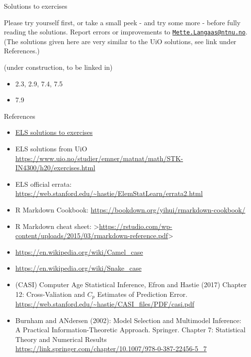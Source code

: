 \documentclass[
  ignorenonframetext,
]{beamer}
\providecommand{\tightlist}{%
  \setlength{\itemsep}{0pt}\setlength{\parskip}{0pt}}
\begin{document}
\begin{frame}{Solutions to exercises}
\protect\hypertarget{solutions-to-exercises}{}

Please try yourself first, or take a small peek - and try some more -
before fully reading the solutions. Report errors or improvements to
\href{mailto:Mette.Langaas@ntnu.no}{\nolinkurl{Mette.Langaas@ntnu.no}}.
(The solutions given here are very similar to the UiO solutions, see
link under References.)

(under construction, to be linked in)

\begin{itemize}
\tightlist
\item
  2.3, 2.9, 7.4, 7.5
\item
  7.9
\end{itemize}

\end{frame}

\begin{frame}{References}
\protect\hypertarget{references}{}

\begin{itemize}
\item
  \href{https://waxworksmath.com/Authors/G_M/Hastie/hastie.html}{ELS
  solutions to exercises}
\item
  ELS solutions from UiO
  \url{https://www.uio.no/studier/emner/matnat/math/STK-IN4300/h20/exercises.html}
\item
  ELS official errata:
  \url{https://web.stanford.edu/~hastie/ElemStatLearn/errata2.html}
\item
  R Markdown Cookbook:
  \url{https://bookdown.org/yihui/rmarkdown-cookbook/}
\item
  R Markdown cheat sheet:
  \textgreater{}\url{https://rstudio.com/wp-content/uploads/2015/03/rmarkdown-reference.pdf}\textgreater{}
\item
  \url{https://en.wikipedia.org/wiki/Camel_case}
\item
  \url{https://en.wikipedia.org/wiki/Snake_case}
\item
  (CASI) Computer Age Statistical Inference, Efron and Hastie (2017)
  Chapter 12: Cross-Valiation and \(C_p\) Estimates of Prediction Error.
  \url{https://web.stanford.edu/~hastie/CASI_files/PDF/casi.pdf}
\item
  Burnham and ANdersen (2002): Model Selection and Multimodel Inference:
  A Practical Information-Theoretic Approach. Springer. Chapter 7:
  Statistical Theory and Numerical Results
  \url{https://link.springer.com/chapter/10.1007/978-0-387-22456-5_7}
\end{itemize}

\end{frame}
\end{document}
